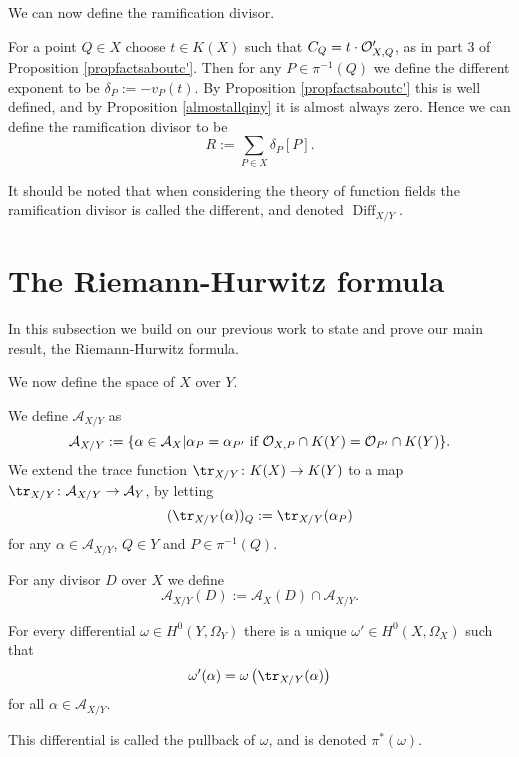 We can now define the ramification divisor.


    \begin{defn}\label{definitiondifferent}
    For a point $Q\in X$ choose $t\in K(X)$ such that $C_Q = t\cdot {\cal O}_{X,Q}'$, as in part 3 of Proposition \ref{propfactsaboutc'}.
    Then for any $P\in \pi^{-1}(Q)$ we define the different exponent to be $\delta_P := -v_P(t)$.
    By Proposition \ref{propfactsaboutc'} this is well defined, and by Proposition \ref{almostallqiny} it is almost always zero.
    Hence we can define the ramification divisor to be
        \[
        R := \sum_{P\in X} \delta_P [P].
        \]
    \end{defn}

    \begin{rem}
    It should be noted that when considering the theory of function fields the ramification divisor is called the different, and denoted $\operatorname{Diff}_{X/Y}$.
    \end{rem}


\section{The Riemann-Hurwitz formula}

In this subsection we build on our previous work to state and prove our main result, the Riemann-Hurwitz formula.

We now define the \adele space of $X$ over $Y$.

    \begin{defn}
    We define $\mathcal {A}_{X/Y}$ as
        \[
        \mathcal{A}_{X/Y} := \{\alpha \in \mathcal{A}_X | \alpha_P =\alpha_{P'}\ \text{if}\ {\cal O}_{X,P}\cap K(Y) = {\cal O}_{P'}\cap K(Y)\}.
        \]
    We extend the trace function $\tr_{X/Y}\colon K(X)\rightarrow K(Y)$ to a map $\tr_{X/Y}\colon \mathcal{A}_{X/Y} \rightarrow \mathcal{A}_Y$,  by letting
        \[
        (\tr_{X/Y}(\alpha))_Q := \tr_{X/Y}(\alpha_P)
        \]
    for any $\alpha \in \mathcal{A}_{X/Y}$, $Q\in Y$ and $P\in \pi^{-1}(Q)$.
    
    For any divisor $D$ over $X$ we define
        \[
        \mathcal{A}_{X/Y}(D) := \mathcal{A}_X(D) \cap \mathcal{A}_{X/Y}.
        \]
    
    \end{defn}


    \begin{defn}\label{theoremdetailedhurwitz}
    For every differential $\omega\in H^0(Y,\Omega_Y)$ there is a unique $\omega'\in H^0(X,\Omega_X)$ such that
        \[
        \omega'(\alpha) = \omega\left(\tr_{X/Y}(\alpha)\right)
        \]
    for all $\alpha \in {\mathcal A}_{X/Y}$.
    
    This differential is called the pullback of $\omega$, and is denoted $\pi^*(\omega)$. 
    \end{defn}

